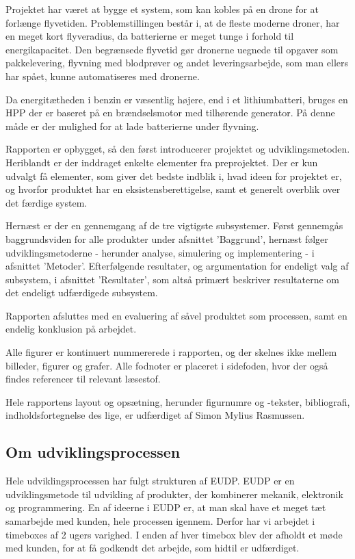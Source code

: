 Projektet har været at bygge et system, som kan kobles på en drone for at forlænge flyvetiden. Problemstillingen består i, at de fleste moderne droner, har en meget kort flyveradius, da batterierne er meget tunge i forhold til energikapacitet. Den begrænsede flyvetid gør dronerne uegnede til opgaver som pakkelevering, flyvning med blodprøver og andet leveringsarbejde, som man ellers har spået, kunne automatiseres med dronerne.

Da energitætheden i benzin er væsentlig højere, end i et lithiumbatteri, bruges en HPP der er baseret på en brændselsmotor med tilhørende generator. På denne måde er der  mulighed for at lade batterierne under flyvning.

Rapporten er opbygget, så den først introducerer projektet og udviklingsmetoden. Heriblandt er der inddraget enkelte elementer fra preprojektet. Der er kun udvalgt få elementer, som giver det bedste indblik i, hvad ideen for projektet er, og hvorfor produktet har en eksistensberettigelse, samt et generelt overblik over det færdige system. 

Hernæst er der en gennemgang af de tre vigtigste subsystemer. Først gennemgås baggrundsviden for alle produkter under afsnittet ’Baggrund’, hernæst følger udviklingsmetoderne - herunder analyse, simulering og implementering - i afsnittet ’Metoder’. Efterfølgende resultater, og argumentation for endeligt valg af subsystem, i afsnittet ’Resultater’, som altså primært beskriver resultaterne om det endeligt udfærdigede subsystem. 

Rapporten afsluttes med en evaluering af såvel produktet som processen, samt en endelig konklusion på arbejdet. 

Alle figurer er kontinuert nummererede i rapporten, og der skelnes ikke mellem billeder, figurer og grafer. Alle fodnoter er placeret i sidefoden, hvor der også findes referencer til relevant læsestof.%

Hele rapportens layout og opsætning, herunder figurnumre og -tekster, bibliografi, indholdsfortegnelse des lige, er udfærdiget af Simon Mylius Rasmussen.

\subsection{Om udviklingsprocessen}
\label{sec:om-udvikl}

Hele udviklingsprocessen har fulgt strukturen af EUDP. EUDP er en udviklingsmetode til udvikling af produkter, der kombinerer mekanik, elektronik og programmering. En af ideerne i EUDP er, at man skal have et meget tæt samarbejde med kunden, hele processen igennem. Derfor har vi arbejdet i timeboxes af 2 ugers varighed. I enden af hver timebox blev der afholdt et møde med kunden, for at få godkendt det arbejde, som hidtil er udfærdiget. 

